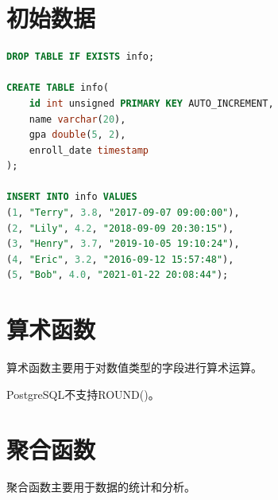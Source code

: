 \documentclass[12pt, openany, oneside]{book}
\begin{document}
\section{初始数据}


\begin{lstlisting}[language=SQL]
DROP TABLE IF EXISTS info;

CREATE TABLE info(
    id int unsigned PRIMARY KEY AUTO_INCREMENT,
    name varchar(20),
    gpa double(5, 2),
    enroll_date timestamp
);

INSERT INTO info VALUES
(1, "Terry", 3.8, "2017-09-07 09:00:00"),
(2, "Lily", 4.2, "2018-09-09 20:30:15"),
(3, "Henry", 3.7, "2019-10-05 19:10:24"),
(4, "Eric", 3.2, "2016-09-12 15:57:48"),
(5, "Bob", 4.0, "2021-01-22 20:08:44");
\end{lstlisting}

\vspace{0.5cm}

\section{算术函数}

算术函数主要用于对数值类型的字段进行算术运算。

\begin{table}[H]
	\centering
	\caption{算术函数}
\end{table}

PostgreSQL不支持ROUND()。\\

\section{聚合函数}

聚合函数主要用于数据的统计和分析。
\end{document}

